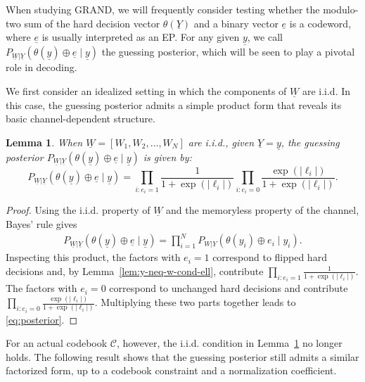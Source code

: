 \documentclass[letterpaper,draftclsnofoot,onecolumn]{IEEEtran}
\newtheorem{lemma}{Lemma}
\begin{document}
When studying GRAND, we will frequently consider testing whether the modulo-two sum of the hard decision vector $\theta(\underline{Y})$ and a binary vector $\underline{e}$ is a codeword, where $\underline{e}$ is usually interpreted as an EP. For any given $\underline{y}$, we call $P_{\underline{W}|\underline{Y}}(\theta(\underline{y})\oplus \underline{e} \mid \underline{y})$ the guessing posterior, which will be seen to play a pivotal role in decoding.


We first consider an idealized setting in which the components of $\underline{W}$ are i.i.d. In this case, the guessing posterior admits a simple product form that reveals its basic channel-dependent structure.

\begin{lemma}\label{lemma:posterior_probability}
    When $\underline{W} = [{W}_1, {W}_2, \ldots, {W}_N]$ are i.i.d., given $\underline{Y} = \underline{y}$, the guessing posterior $P_{\underline{W}|\underline{Y}}(\theta(\underline{y})\oplus \underline{e} \mid \underline{y})$ is given by:
    \begin{equation}\label{eq:posterior}
        P_{\underline{W}|\underline{Y}}(\theta(\underline{y})\oplus \underline{e} \mid \underline{y}) =  \prod_{i:e_i = 1}\frac{1}{1+\exp(|\ell_i|)} \prod_{i:e_i = 0}\frac{\exp(|\ell_i|)}{1+\exp(|\ell_i|)}.
    \end{equation}
\end{lemma}
\begin{proof}
    Using the i.i.d. property of $\underline{W}$ and the 
    memoryless property of the channel, Bayes' rule gives
    \begin{eqnarray}
        P_{\underline{W}|\underline{Y}}\left(\theta(\underline{y}) \oplus \underline{e} \mid \underline{y}\right) = \prod_{i = 1}^N P_{{W}|Y} \left(\theta(y_i) \oplus e_i \mid y_i\right).
    \end{eqnarray}
Inspecting this product, the factors with $e_i = 1$ correspond to flipped hard decisions and, by Lemma~\ref{lem:y-neq-w-cond-ell}, contribute $\prod_{i:e_i = 1} \frac{1}{1+\exp(|\ell_i|)}$. The factors with $e_i = 0$ correspond to unchanged hard decisions and contribute $\prod_{i:e_i = 0} \frac{\exp(|\ell_i|)}{1+\exp(|\ell_i|)}$. Multiplying these two parts together leads to \eqref{eq:posterior}.
\end{proof}

For an actual codebook $\mathcal{C}$, however, the i.i.d. condition in Lemma~\ref{lemma:posterior_probability} no longer holds. The following result shows that the guessing posterior still admits a similar factorized form, up to a codebook constraint and a normalization coefficient.
\end{document}
